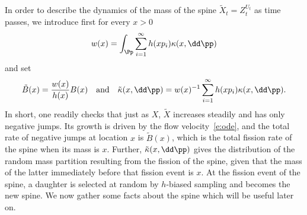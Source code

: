 In order to describe the dynamics of the mass of the spine $\tilde X_t=Z^{U_t}_t$ as time passes, we introduce first for every $x>0$
\[
w(x)=\int_{\Pp}\sum_{i=1}^{\infty} h(xp_i) \kappa(x, \dd \pp)
\]
and set
\begin{equation}\label{e:ratespine}
\tilde {B}(x)= \frac{w(x)}{h(x)}{B}(x)\quad\text{and}\quad \tilde \kappa(x, \dd \pp)= w(x)^{-1} \sum_{i=1}^{\infty} h(xp_i) \kappa(x, \dd \pp).
\end{equation}
In short, one readily checks that just as $X$, $\tilde X$ increases steadily and has only negative jumps. Its growth is driven by the flow velocity~\eqref{e:ode}, and the total rate of negative jumps at location $x$ is $\tilde {B}(x)$, which is the total fission rate of the spine when its mass is $x$. Further, $\tilde \kappa(x, \dd \pp)$ gives the distribution of the random mass partition resulting from the fission of the spine, given that the mass of the latter immediately before that fission event is $x$. At the fission event of the spine, a daughter is selected at random by $h$-biased sampling and becomes the new spine. We now gather some facts about the spine which will be useful later on.


